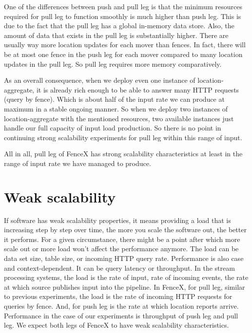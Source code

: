 \documentclass[a4]{report}
\begin{document}
    One of the differences between push and pull leg is that the minimum resources required for pull leg to function
    smoothly is much higher than push leg.
    This is due to the fact that the pull leg has a global in-memory data store.
    Also, the amount of data that exists in the pull leg is substantially higher.
    There are usually way more location updates for each mover than fences.
    In fact, there will be at most one fence in the push leg for each mover compared to many location updates in the pull leg.
    So pull leg requires more memory comparatively.

    As an overall consequence, when we deploy even one instance of location-aggregate, it is already rich enough to be
    able to answer many HTTP requests (query by fence).
    Which is about half of the input rate we can produce at maximum in a stable ongoing manner.
    So when we deploy two instances of location-aggregate with the mentioned resources, two available instances just handle our full capacity of input load production.
    So there is no point in continuing strong scalability experiments for pull leg within this range of input.

    All in all, pull leg of FenceX has strong scalability characteristics at least in the range of input rate we have
    managed to produce.


    \section{Weak scalability}
    If software has weak scalability properties, it means providing a load that is increasing step by step over
    time, the more you scale the software out, the better it performs.
    For a given circumstance, there might be a point after which more scale out or more load won't affect
    the performance anymore.
    The load can be data set size, table size, or incoming HTTP query rate.
    Performance is also case and context-dependent.
    It can be query latency or throughput.
    In the stream processing systems, the load is the rate of input, rate of incoming events, the rate at
    which source publishes input into the pipeline.
    In FenceX, for pull leg, similar to previous experiments, the load is the rate of incoming HTTP requests for queries by
    fence.
    And, for push leg is the rate at which location reports arrive.
    Performance in the case of our experiments is throughput of push leg and pull leg.
    We expect both legs of FenceX to have weak scalability characteristics.
\end{document}
